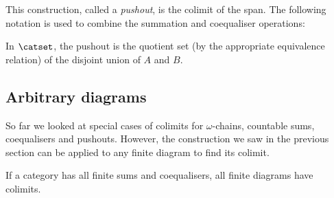 \begin{center}
\end{center}

This construction, called a \emph{pushout}, is the colimit of the span. The
following notation is used to combine the summation and coequaliser operations:

\begin{center}
\end{center}


In $\catset$, the pushout is the quotient set (by the appropriate equivalence
relation) of the disjoint union of $A$ and $B$.

\begin{center}
\end{center}

\subsection{Arbitrary diagrams}

So far we looked at special cases of colimits for $\omega$-chains, countable
sums, coequalisers and pushouts. However, the construction we saw in the
previous section can be applied to any finite diagram to find its colimit.

\begin{proposition}
If a category has all finite sums and coequalisers, all finite diagrams have
colimits.
\end{proposition}

